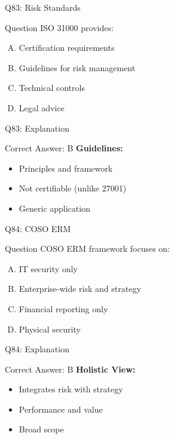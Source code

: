 \documentclass{beamer}
\begin{document}
			\begin{frame}{Q83: Risk Standards}
				\begin{block}{Question}
					ISO 31000 provides:
				\end{block}
				\begin{enumerate}[(A)]
					\item Certification requirements
					\item Guidelines for risk management
					\item Technical controls
					\item Legal advice
				\end{enumerate}
			\end{frame}
			\begin{frame}{Q83: Explanation}
				\begin{block}{Correct Answer: B}
					\textbf{Guidelines:}
					\begin{itemize}
						\item Principles and framework
						\item Not certifiable (unlike 27001)
						\item Generic application
					\end{itemize}
				\end{block}
			\end{frame}
			
			\begin{frame}{Q84: COSO ERM}
				\begin{block}{Question}
					COSO ERM framework focuses on:
				\end{block}
				\begin{enumerate}[(A)]
					\item IT security only
					\item Enterprise-wide risk and strategy
					\item Financial reporting only
					\item Physical security
				\end{enumerate}
			\end{frame}
			\begin{frame}{Q84: Explanation}
				\begin{block}{Correct Answer: B}
					\textbf{Holistic View:}
					\begin{itemize}
						\item Integrates risk with strategy
						\item Performance and value
						\item Broad scope
					\end{itemize}
				\end{block}
			\end{frame}
			
\end{document}
